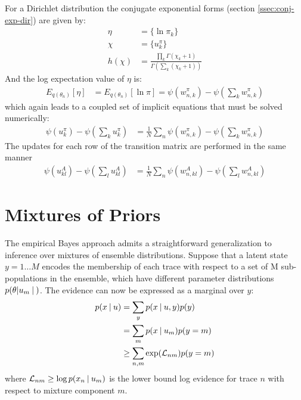 For a Dirichlet distribution the conjugate exponential forms (section \ref{ssec:conj-exp-dir}) are given by:
\begin{align}
  \eta &= \{ \ln \pi_k \} \\
  \chi &= \{ u^\pi_k \} \\
  h(\chi) &= \frac{\prod_k \Gamma(\chi_k+1)}{\Gamma(\sum_k (\chi_k + 1))}
\end{align}
And the log expectation value of $\eta$ is:
\begin{align}
 E_{q(\theta_n)} [ \eta ] &= E_{q(\theta_n)} [ \ln \pi ] = \psi(w^\pi_{n,k}) - \psi(\sum_k w^\pi_{n,k})
\end{align}
which again leads to a coupled set of implicit equations that must be solved numerically: 
\begin{align}
  \psi(u^\pi_{k}) - \psi(\sum_k u^\pi_{k}) 
  &= 
  \frac{1}{N} \sum_n
  \psi(w^\pi_{n,k}) - \psi(\sum_k w^\pi_{n,k})
\end{align}
The updates for each row of the transition matrix are performed in the same manner   
\begin{align}
  \psi(u^A_{kl}) - \psi(\sum_l u^A_{kl}) 
  &= 
  \frac{1}{N} \sum_n
  \psi(w^A_{n,kl}) - \psi(\sum_l w^A_{n,kl})
\end{align}

\section{Mixtures of Priors}

The empirical Bayes approach admits a straightforward generalization to inference over mixtures of ensemble distributions. Suppose that a latent state $y = {1 \ldots M}$ encodes the membership of each trace with respect to a set of M sub-populations in the ensemble, which have different parameter distributions $\p{\theta | u_m}$. The evidence can now be expressed as a marginal over $y$:
\begin{align}
 p(x \:|\: u) 
 &= \sum_y p(x \:|\: u,y) p(y) \\
 &= \sum_m p(x \:|\: u_m) p(y=m) \\
 &\geq \sum_{n,m} \exp(\mathcal{L}_{nm}) p(y=m) 
\end{align}
where $\mathcal{L}_{nm} \geq \log p(x_n \:|\: u_m)$ is the lower bound log evidence for trace $n$ with respect to mixture component $m$.

